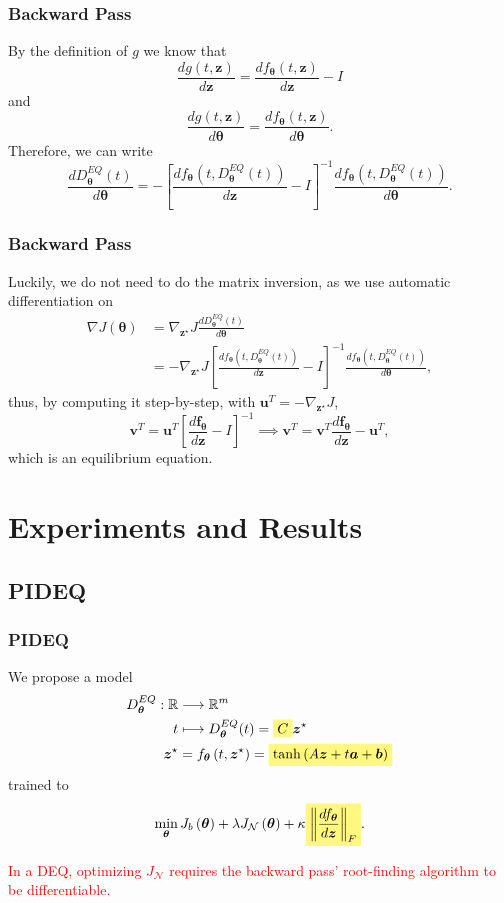 \documentclass[t]{beamer}
\newcommand{\R}{\mathbb{R}}
\newcommand{\highlight}[1]{%
  \colorbox{yellow!50}{$\displaystyle#1$}}
\begin{document}
\begin{frame}
    \frametitle{Backward Pass}
    
    By the definition of $g$ we know that \[
	\frac{d g(t, \bm{z})}{d \bm{z}} = \frac{d f_{\bm{\theta}}(t,\bm{z})}{d \bm{z}} - I 
    \] and \[
    \frac{d g(t, \bm{z})}{d \bm{\theta}} = \frac{d f_{\bm{\theta}}(t,\bm{z})}{d \bm{\theta}}
    .\] Therefore, we can write \[
	\frac{d D^{EQ}_{\bm{\theta}}(t)}{d \bm{\theta}} = - \left[ \frac{d f_{\bm{\theta}}(t,D^{EQ}_{\bm{\theta}}(t))}{d \bm{z}} - I \right]^{-1} \frac{d f_{\bm{\theta}}(t,D^{EQ}_{\bm{\theta}}(t))}{d \bm{\theta}}
    .\] 
\end{frame}

\begin{frame}
    \frametitle{Backward Pass}

    Luckily, we do not need to do the matrix inversion, as we use automatic differentiation on
    \begin{align*}
	\nabla J\left( \bm{\theta} \right) &= \nabla_{\bm{z}^{\star}} J \frac{d D^{EQ}_{\bm{\theta}}(t)}{d \bm{\theta}} \\
	&= - \nabla_{\bm{z}^{\star}} J \left[ \frac{d f_{\bm{\theta}}(t,D^{EQ}_{\bm{\theta}}(t))}{d \bm{z}} - I \right]^{-1} \frac{d f_{\bm{\theta}}(t,D^{EQ}_{\bm{\theta}}(t))}{d \bm{\theta}},
    \end{align*}\pause
    thus, by computing it step-by-step, with $\bm{u}^T=- \nabla_{\bm{z}^{\star}} J$, \[
	\bm{v}^T = \bm{u}^T\left[ \frac{d \bm{f}_{\bm{\theta}}}{d \bm{z}} - I \right]^{-1} \implies \bm{v}^T = \bm{v}^T \frac{d \bm{f}_{\bm{\theta}}}{d \bm{z}} - \bm{u}^T
    ,\] which is an equilibrium equation.
\end{frame}

\section{Experiments and Results}

\subsection{PIDEQ}

\begin{frame}
    \frametitle{PIDEQ}
    We propose a model 
    \begin{align*}
	D^{EQ}_{\bm{\theta}}: \R &\longrightarrow \R^{m} \\
	t &\longmapsto 	D^{EQ}_{\bm{\theta}}(	t) = \highlight{C} \bm{z}^{\star} \\
	\bm{z}^{\star} &= f_{\bm{\theta}}\left( t, \bm{z}^{\star} \right)= \highlight{\tanh \left( A\bm{z} + t\bm{a} + \bm{b} \right)}
    \end{align*}
    trained to \[
     \min_{\bm{\theta}} J_b\left( \bm{\theta} \right) + \lambda J_{\mathcal{N}}\left( \bm{\theta} \right) + \kappa \highlight{\left\lVert \frac{d f_{\bm{\theta}}}{d \bm{z}}\right\rVert_F}
    .\] \pause
    
    \textcolor{red}{In a DEQ, optimizing $J_{\mathcal{N}}$ requires the backward pass' root-finding algorithm to be differentiable.}
\end{frame}
\end{document}
